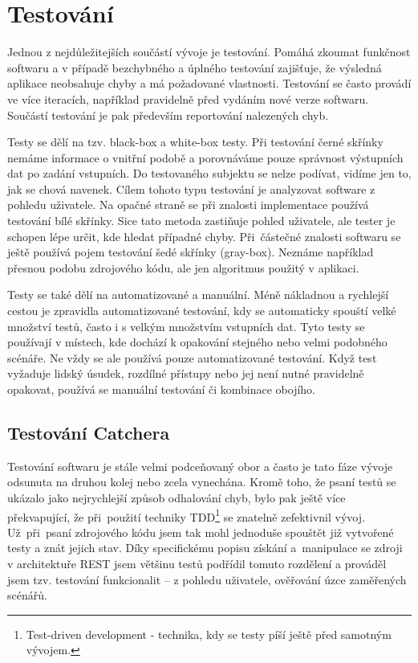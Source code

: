 \chapter{Testování}


Jednou z nejdůležitejších součástí vývoje je testování. Pomáhá zkoumat funkčnost softwaru a v případě bezchybného
a úplného testování zajišťuje, že výsledná aplikace neobsahuje chyby a má požadované vlastnosti.
Testování se často provádí ve více iteracích, například pravidelně před vydáním nové verze softwaru.
Součástí testování je pak především reportování nalezených chyb.

Testy se dělí na tzv. black-box a white-box testy. Při testování černé skřínky nemáme informace o vnitřní podobě a porovnáváme
pouze správnost výstupních dat po zadání vstupních. Do testovaného subjektu se nelze podívat, vidíme jen to, jak se chová navenek.
Cílem tohoto typu testování je analyzovat software z pohledu uživatele.
Na opačné straně se při znalosti implementace používá testování bílé skřínky. Sice tato metoda zastiňuje pohled uživatele,
ale tester je schopen lépe určit, kde hledat případné chyby. Při~částečné znalosti softwaru se ještě používá pojem testování šedé skřínky (gray-box).
Neznáme například přesnou podobu zdrojového kódu, ale jen algoritmus použitý v aplikaci. 

Testy se také dělí na automatizované a manuální. Méně nákladnou a rychlejší cestou je zpravidla automatizované testování,
kdy se automaticky spouští velké množství testů, často i s velkým množstvím vstupních dat. Tyto testy se používají v místech,
kde dochází k opakování stejného nebo velmi podobného scénáře. Ne vždy se ale používá pouze automatizované testování.
Když test vyžaduje lidský úsudek, rozdílné přístupy nebo jej není nutné pravidelně opakovat, používá se manuální testování či kombinace obojího.

\section{Testování Catchera}

Testování softwaru je stále velmi podceňovaný obor a často je tato fáze vývoje odsunuta na druhou kolej nebo zcela vynechána.
Kromě toho, že psaní testů se ukázalo jako nejrychlejší způsob odhalování chyb, bylo pak ještě více překvapující, že při~použití
techniky TDD\footnote{Test-driven development - technika, kdy se testy píší ještě před samotným vývojem.} se znatelně zefektivnil
vývoj. Už~při~psaní zdrojového kódu jsem tak mohl jednoduše spouštět již vytvořené testy a znát jejich stav.
Díky specifickému popisu získání a~manipulace se zdroji v architektuře REST jsem většinu testů podřídil tomuto rozdělení a prováděl
jsem tzv. testování funkcionalit -- z pohledu uživatele, ověřování úzce zaměřených scénářů.

